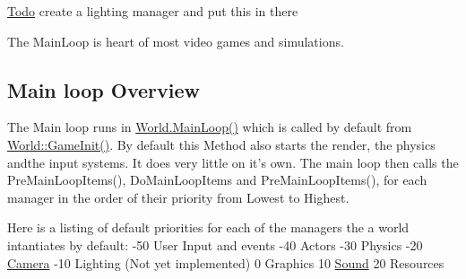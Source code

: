 \begin{Desc}
\item[\hyperlink{todo__todo000031}{Todo}]create a lighting manager and put this in there \end{Desc}


The MainLoop is heart of most video games and simulations.\hypertarget{mainloop1_mainloopoverview1}{}\subsection{Main loop Overview}\label{mainloop1_mainloopoverview1}
The Main loop runs in \hyperlink{classphys_1_1World_af1d9e36d43f5e50543fa2351a32c8362}{World.MainLoop()} which is called by default from \hyperlink{classphys_1_1World_a21cc36be08a61f40619584d4c438936b}{World::GameInit()}. By default this Method also starts the render, the physics andthe input systems. It does very little on it's own. The main loop then calls the PreMainLoopItems(), DoMainLoopItems and PreMainLoopItems(), for each manager in the order of their priority from Lowest to Highest. \par
 Here is a listing of default priorities for each of the managers the a world intantiates by default: -\/50 User Input and events -\/40 Actors -\/30 Physics -\/20 \hyperlink{classphys_1_1Camera}{Camera} -\/10 Lighting (Not yet implemented) 0 Graphics 10 \hyperlink{classphys_1_1Sound}{Sound} 20 Resources 